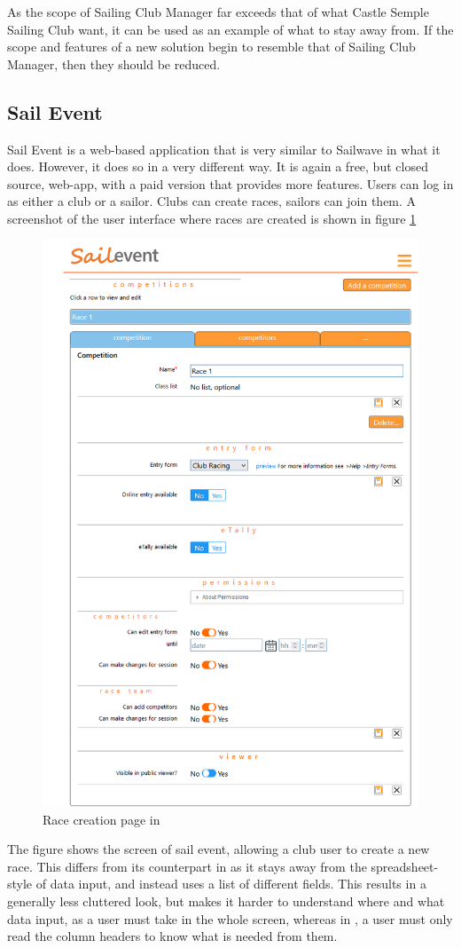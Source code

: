 \documentclass{l4proj}
\begin{document}
As the scope of Sailing Club Manager far exceeds that of what Castle Semple Sailing Club want, it can be used as an example of what to stay away from. If the scope and features of a new solution begin to resemble that of Sailing Club Manager, then they should be reduced.


\subsection{Sail Event}

Sail Event \citet{SailEvent} is a web-based application that is very similar to Sailwave in what it does. However, it does so in a very different way. It is again a free, but closed source, web-app, with a paid version that provides more features. Users can log in as either a club or a sailor. Clubs can create races, sailors can join them. A screenshot of the user interface where races are created is shown in figure \ref{fig:sailEvent}

\begin{figure}[h!]
    \centering
    \includegraphics[width=0.6\linewidth]{images/Sailevent.png} 

    \caption{Race creation page in \citet{SailEvent}
    }

    \label{fig:sailEvent}
\end{figure}


The figure shows the screen of sail event, allowing a club user to create a new race. This differs from its counterpart in \citet{sailwave} as it stays away from the spreadsheet-style of data input, and instead uses a list of different fields. This results in a generally less cluttered look, but makes it harder to understand where and what data input, as a user must take in the whole screen, whereas in \citet{sailwave}, a user must only read the column headers to know what is needed from them.
\end{document}
